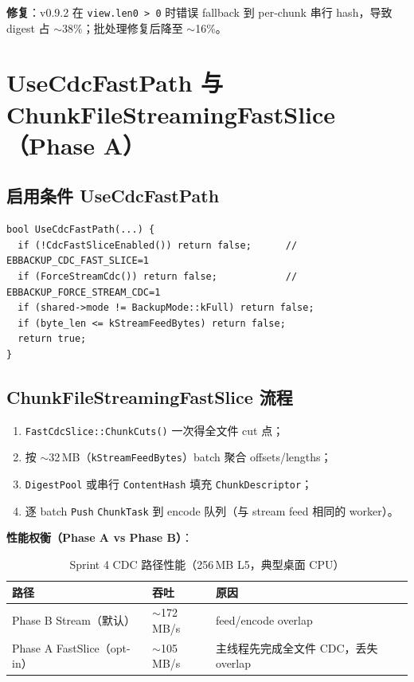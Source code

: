 \textbf{修复}：v0.9.2 在 \texttt{view.len0 > 0} 时错误 fallback 到 per-chunk 串行 hash，导致 digest 占 $\sim$38\%；批处理修复后降至 $\sim$16\%。

\section{UseCdcFastPath 与 ChunkFileStreamingFastSlice（Phase A）}

\subsection{启用条件 UseCdcFastPath}

\begin{lstlisting}[caption={Fast path 门控},label={lst:use-cdc-fast}]
bool UseCdcFastPath(...) {
  if (!CdcFastSliceEnabled()) return false;      // EBBACKUP_CDC_FAST_SLICE=1
  if (ForceStreamCdc()) return false;            // EBBACKUP_FORCE_STREAM_CDC=1
  if (shared->mode != BackupMode::kFull) return false;
  if (byte_len <= kStreamFeedBytes) return false;
  return true;
}
\end{lstlisting}

\subsection{ChunkFileStreamingFastSlice 流程}

\begin{enumerate}
  \item \texttt{FastCdcSlice::ChunkCuts()} 一次得全文件 cut 点；
  \item 按 $\sim$32\,MB（\texttt{kStreamFeedBytes}）batch 聚合 offsets/lengths；
  \item \texttt{DigestPool} 或串行 \texttt{ContentHash} 填充 \texttt{ChunkDescriptor}；
  \item 逐 batch \texttt{Push} \texttt{ChunkTask} 到 encode 队列（与 stream feed 相同的 worker）。
\end{enumerate}

\textbf{性能权衡（Phase A vs Phase B）}：

\begin{table}[htbp]
\centering
\caption{Sprint 4 CDC 路径性能（256\,MB L5，典型桌面 CPU）}
\begin{tabular}{@{}lll@{}}
\toprule
路径 & 吞吐 & 原因 \\
\midrule
Phase B Stream（默认） & $\sim$172\,MB/s & feed/encode overlap \\
Phase A FastSlice（opt-in） & $\sim$105\,MB/s & 主线程先完成全文件 CDC，丢失 overlap \\
\bottomrule
\end{tabular}
\end{table}

